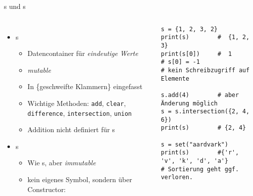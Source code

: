 \begin{frame}[fragile]{s und s}
%
\begin{columns}[T]
\begin{itemize}
\item {}s
	\begin{itemize}
	\item Datencontainer für \emph{eindeutige Werte}
	\item \emph{mutable}
	\item In \{geschweifte Klammern\} eingefasst
	\item Wichtige Methoden: \texttt{add}, \texttt{clear}, \texttt{difference}, \texttt{intersection}, \texttt{union}
	\item Addition nicht definiert für s
	\end{itemize}
\item {}s
	\begin{itemize}
	\item Wie s, aber \emph{immutable}
	\item kein eigenes Symbol, sondern über Constructor: 
	\end{itemize}
\end{itemize}
%
\begin{codebox}
\begin{verbatim}
s = {1, 2, 3, 2}
print(s)        #  {1, 2, 3}
print(s[0])     #  1
# s[0] = -1     
# kein Schreibzugriff auf Elemente

s.add(4)        # aber Änderung möglich
s = s.intersection({2, 4, 6})
print(s)        # {2, 4}

s = set("aardvark")
print(s)        #{'r', 'v', 'k', 'd', 'a'}
# Sortierung geht ggf. verloren.
\end{verbatim}
\end{codebox}
\end{columns}
%
\end{frame}


